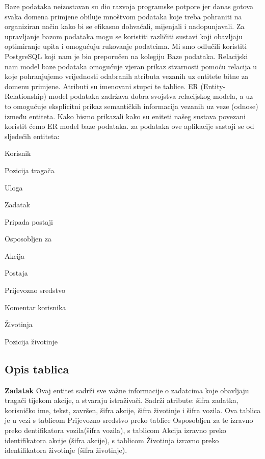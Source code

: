 		Baze podataka neizostavan su dio razvoja programske potpore jer danas gotova svaka domena primjene 
		obiluje mnoštvom podataka koje treba pohraniti na organiziran način kako bi se efikasno dohvaćali,
		 mijenjali i nadopunjavali. Za upravljanje bazom podataka mogu se koristiti različiti sustavi koji 
		 obavljaju optimiranje upita i omogućuju rukovanje podatcima. Mi smo odlučili koristiti PostgreSQL 
		 koji nam je bio preporučen na kolegiju Baze podataka. \newline Relacijski nam model baze podataka 
		 omogućuje vjeran prikaz stvarnosti pomoću relacija u koje pohranjujemo vrijednosti odabranih 
		 atributa vezanih uz entitete bitne za domenu primjene. Atributi su imenovani stupci te tablice. ER (Entity-Relationship) model podataka zadržava dobra svojstva relacijskog modela, a uz to omogućuje eksplicitni prikaz semantičkih informacija vezanih uz veze (odnose) između entiteta. Kako bismo prikazali kako su eniteti našeg sustava povezani koristit ćemo ER model baze podataka.
za podataka ove aplikacije sastoji se od sljedećih entiteta:
		\begin{packed_item}
			\item Korisnik
			\item Pozicija tragača
			\item Uloga
			\item Zadatak 
			\item Pripada postaji
			\item Osposobljen za
			\item Akcija
			\item Postaja
			\item Prijevozno sredstvo
			\item Komentar korisnika 
			\item Životinja
			\item Pozicija životinje
		\end{packed_item}

		\eject
			\subsection{Opis tablica}
			
					\textbf {Zadatak} Ovaj entitet sadrži sve važne informacije o zadatcima koje obavljaju tragači tijekom akcije, a stvaraju istraživači. Sadrži
				atribute: šifra zadatka, korisničko ime, tekst, završen, šifra akcije, šifra životinje i šifra vozila. 
				Ova tablica je u vezi s tablicom Prijevozno sredstvo preko tablice Osposobljen za te izravno preko 
				dentifikatora vozila(šifra vozila), s tablicom Akcija izravno preko identifikatora akcije (šifra akcije), 
				s tablicom Životinja izravno preko identifikatora životinje (šifra životinje).
				
